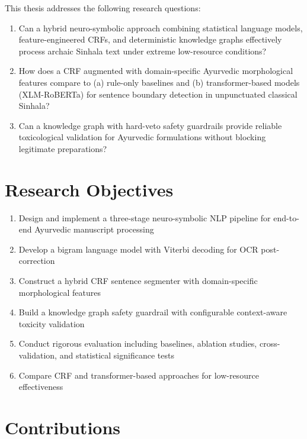 \documentclass[12pt, a4paper, twoside]{report}
\begin{document}
This thesis addresses the following research questions:

\begin{enumerate}[label=\textbf{RQ\arabic*:}]
    \item Can a hybrid neuro-symbolic approach combining statistical language models, feature-engineered CRFs, and deterministic knowledge graphs effectively process archaic Sinhala text under extreme low-resource conditions?
    
    \item How does a CRF augmented with domain-specific Ayurvedic morphological features compare to (a) rule-only baselines and (b) transformer-based models (XLM-RoBERTa) for sentence boundary detection in unpunctuated classical Sinhala?
    
    \item Can a knowledge graph with hard-veto safety guardrails provide reliable toxicological validation for Ayurvedic formulations without blocking legitimate preparations?
\end{enumerate}

\section{Research Objectives}
\label{sec:objectives}

\begin{enumerate}
    \item Design and implement a three-stage neuro-symbolic NLP pipeline for end-to-end Ayurvedic manuscript processing
    \item Develop a bigram language model with Viterbi decoding for OCR post-correction
    \item Construct a hybrid CRF sentence segmenter with domain-specific morphological features
    \item Build a knowledge graph safety guardrail with configurable context-aware toxicity validation
    \item Conduct rigorous evaluation including baselines, ablation studies, cross-validation, and statistical significance tests
    \item Compare CRF and transformer-based approaches for low-resource effectiveness
\end{enumerate}

\section{Contributions}
\label{sec:contributions}
\end{document}
